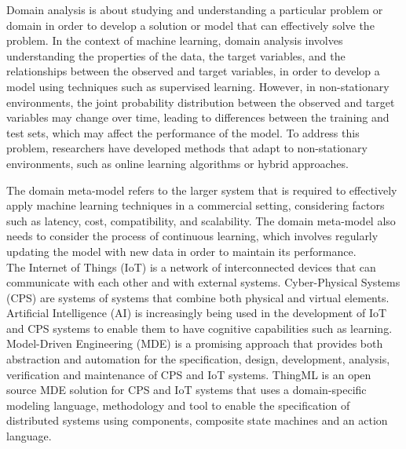Domain analysis \cite{mdApproachMonitoring}  is about studying and understanding a particular problem or domain in order to develop a solution or model that can effectively solve the problem. In the context of machine learning, domain analysis involves understanding the properties of the data, the target variables, and the relationships between the observed and target variables, in order to develop a model using techniques such as supervised learning. However, in non-stationary environments, the joint probability distribution between the observed and target variables may change over time, leading to differences between the training and test sets, which may affect the performance of the model. To address this problem, researchers have developed methods that adapt to non-stationary environments, such as online learning algorithms or hybrid approaches.

The domain meta-model refers to the larger system that is required to effectively apply machine learning techniques in a commercial setting, considering factors such as latency, cost, compatibility, and scalability. The domain meta-model also needs to consider the process of continuous learning, which involves regularly updating the model with new data in order to maintain its performance. \\


The Internet of Things (IoT) is a network of interconnected devices that can communicate with each other and with external systems. Cyber-Physical Systems (CPS) are systems of systems that combine both physical and virtual elements. Artificial Intelligence (AI) is increasingly being used in the development of IoT and CPS systems to enable them to have cognitive capabilities such as learning. Model-Driven Engineering (MDE) is a promising approach that provides both abstraction and automation for the specification, design, development, analysis, verification and maintenance of CPS and IoT systems. ThingML \cite{ThingML} is an open source MDE solution for CPS and IoT systems that uses a domain-specific modeling language, methodology and tool to enable the specification of distributed systems using components, composite state machines and an action language. 

